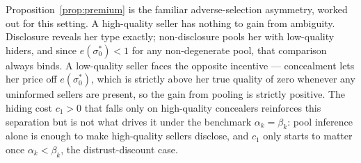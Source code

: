 Proposition~\ref{prop:premium} is the familiar adverse-selection asymmetry, worked out for this setting. A high-quality seller has nothing to gain from ambiguity. Disclosure reveals her type exactly; non-disclosure pools her with low-quality hiders, and since $e(\sigma_0^*)<1$ for any non-degenerate pool, that comparison always binds. A low-quality seller faces the opposite incentive --- concealment lets her price off $e(\sigma_0^*)$, which is strictly above her true quality of zero whenever any uninformed sellers are present, so the gain from pooling is strictly positive. The hiding cost $c_1>0$ that falls only on high-quality concealers reinforces this separation but is not what drives it under the benchmark $\alpha_k=\beta_k$: pool inference alone is enough to make high-quality sellers disclose, and $c_1$ only starts to matter once $\alpha_k<\beta_k$, the distrust-discount case.
